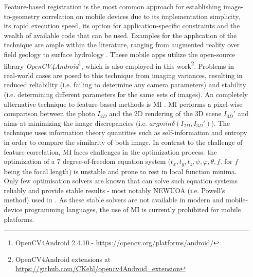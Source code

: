 \documentclass[review]{elsarticle}
\begin{document}
Feature-based registration is the most common approach for establishing image-to-geometry correlation on mobile devices due to its implementation simplicity, its rapid execution speed, its option for application-specific constraints and the wealth of available code that can be used. Examples for the application of the technique are ample within the literature, ranging from augmented reality \cite{Gauglitz2014,Sweeney2015} over field geology \cite{Kehl2016_ISPRS,Kehl2017_VGC} to surface hydrology \cite{Kroehnert2017a,Boerner2016}. These mobile apps utilize the open-source library \textit{OpenCV4Android}\footnote{OpenCV4Android 2.4.10 - \url{https://opencv.org/platforms/android/}}, which is also employed in this work\footnote{OpenCV4Android extensions at \url{https://github.com/CKehl/opencv4Android_extension}}. Problems in real-world cases are posed to this technique from imaging variances, resulting in reduced reliability (i.e. failing to determine any camera parameters) and stability (i.e. determining different parameters for the same sets of images). An completely alternative technique to feature-based methods is \gls{MI} \cite{Viola1997,Corsini2013}. \Gls{MI} performs a pixel-wise comparison between the photo $I_{2D}$ and the 2D rendering of the 3D scene $I_{3D}'$ and aims at minimizing the image discrepancies (i.e. $argmin \delta(I_{2D}, I_{3D}')$). The technique uses information theory quantities such as self-information and entropy in order to compare the similarity of both image. In contrast to the challenge of feature correlation, \gls{MI} faces challenges in the optimization process: the optimization of a 7 degree-of-freedom equation system ($t_x,t_y,t_z,\psi,\varphi,\theta,f$, for $f$ being the focal length) is unstable and prone to rest in local function minima. Only few optimisation solvers are known that can solve such equation systems reliably and provide stable results - most notably NEWUOA (i.e. Powell's method\cite{Powell2006}) used in \cite{Corsini2013}. As these stable solvers are not available in modern and mobile-device programming languages, the use of \gls{MI} is currently prohibited for mobile platforms.
\end{document}

